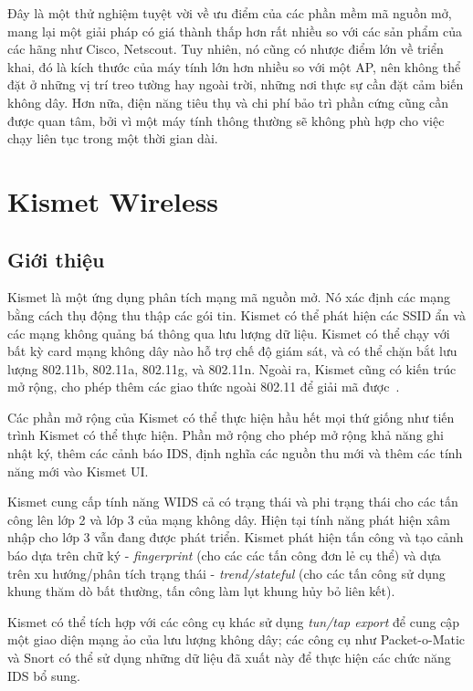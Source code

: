 Đây là một thử nghiệm tuyệt vời về ưu điểm của các phần mềm mã nguồn mở, mang lại một giải pháp có giá thành thấp hơn rất nhiều so với các sản phẩm của các hãng như Cisco, Netscout. Tuy nhiên, nó cũng có nhược điểm lớn về triển khai, đó là kích thước của máy tính lớn hơn nhiều so với một AP, nên không thể đặt ở những vị trí treo tường hay ngoài trời, những nơi thực sự cần đặt cảm biến không dây. Hơn nữa, điện năng tiêu thụ và chi phí bảo trì phần cứng cũng cần được quan tâm, bởi vì một máy tính thông thường sẽ không phù hợp cho việc chạy liên tục trong một thời gian dài.

\restoregeometry

\section{Kismet Wireless}
\subsection{Giới thiệu}
Kismet là một ứng dụng phân tích mạng mã nguồn mở. Nó xác định các mạng bằng cách thụ động thu thập các gói tin. Kismet có thể phát hiện  các SSID ẩn và các mạng không quảng bá thông qua lưu lượng dữ liệu. Kismet có thể chạy với bất kỳ card mạng không dây nào hỗ trợ chế độ giám sát, và có thể chặn bắt lưu lượng 802.11b, 802.11a, 802.11g, và 802.11n. Ngoài ra, Kismet cũng có kiến trúc mở rộng, cho phép thêm các giao thức ngoài 802.11 để giải mã được~\cite{mike2016kismet}.

Các phần mở rộng của Kismet có thể thực hiện hầu hết mọi thứ giống như tiến trình Kismet có thể thực hiện. Phần mở rộng cho phép mở rộng khả năng ghi nhật ký, thêm các cảnh báo IDS, định nghĩa các nguồn thu mới và thêm các tính năng mới vào Kismet UI.

Kismet cung cấp tính năng WIDS cả có trạng thái và phi trạng thái cho các tấn công lên lớp 2 và lớp 3 của mạng không dây. Hiện tại tính năng phát hiện xâm nhập cho lớp 3 vẫn đang được phát triển. Kismet phát hiện tấn công và tạo cảnh báo dựa trên chữ ký - \emph{fingerprint} (cho các các tấn công đơn lẻ cụ thể) và dựa trên xu hướng/phân tích trạng thái - \emph{trend/stateful} (cho các tấn công sử dụng khung thăm dò bất thường, tấn công làm lụt khung hủy bỏ liên kết).

Kismet có thể tích hợp với các công cụ khác sử dụng \emph{tun/tap export} để cung cập một giao diện mạng ảo của lưu lượng không dây; các công cụ như Packet-o-Matic và Snort có thể sử dụng những dữ liệu đã xuất này để thực hiện các chức năng IDS bổ sung.\\ \\ \\


